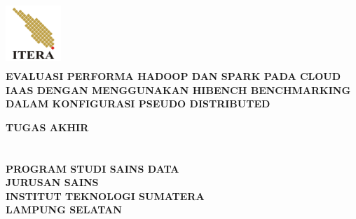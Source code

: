 \begin{titlepage}
\begin{center}
\includegraphics[height=2.5cm, width=2.1cm]{LogoITERA.png}\\[5ex]
\textbf{\fontsize{14pt}{0}\selectfont EVALUASI PERFORMA HADOOP DAN SPARK PADA CLOUD IAAS DENGAN MENGGUNAKAN HIBENCH BENCHMARKING DALAM KONFIGURASI PSEUDO DISTRIBUTED}\\
\vspace{3cm}

\textbf{\fontsize{14pt}{0}\selectfont  TUGAS AKHIR}\\[18ex]
\textbf{\fontsize{12pt}{0}\selectfont{Dimas Wahyu Saputro}}\\ 
\textbf{\fontsize{12pt}{0}\selectfont{120450081}}\\[20ex]
\textbf{\fontsize{12pt}{0}\selectfont PROGRAM STUDI SAINS DATA}\\
\textbf{\fontsize{12pt}{0}\selectfont JURUSAN SAINS}\\
\textbf{\fontsize{12pt}{0}\selectfont INSTITUT TEKNOLOGI SUMATERA}\\
\textbf{\fontsize{12pt}{0}\selectfont LAMPUNG SELATAN}\\
\textbf{\fontsize{12pt}{0}}\\
\vspace{3cm}
\end{center}
\end{titlepage}
